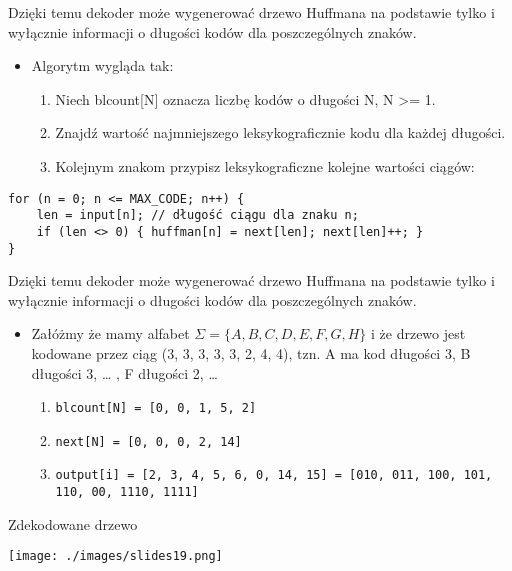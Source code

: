 \documentclass[presentation]{beamer}
\begin{document}
\begin{frame}[fragile,label={sec:orgca05249}]{Dzięki temu dekoder może wygenerować drzewo Huffmana na podstawie tylko i wyłącznie informacji o długości kodów dla poszczególnych znaków.}
 \begin{itemize}
\item Algorytm wygląda tak:
\begin{enumerate}
\item Niech blcount[N] oznacza liczbę kodów o długości N, N >= 1.
\item Znajdź wartość najmniejszego leksykograficznie kodu dla każdej długości.
\item Kolejnym znakom przypisz leksykograficzne kolejne wartości ciągów:
\end{enumerate}
\end{itemize}
\begin{verbatim}
for (n = 0; n <= MAX_CODE; n++) {
    len = input[n]; // długość ciągu dla znaku n;
    if (len <> 0) { huffman[n] = next[len]; next[len]++; }
}
\end{verbatim}
\end{frame}

\begin{frame}[label={sec:orgbed7e80}]{Dzięki temu dekoder może wygenerować drzewo Huffmana na podstawie tylko i wyłącznie informacji o długości kodów dla poszczególnych znaków.}
\begin{itemize}
\item Załóżmy że mamy alfabet \(\Sigma = \{A, B, C, D, E, F, G, H\}\) i
że drzewo jest kodowane przez ciąg (3, 3, 3, 3, 3, 2, 4, 4),
tzn. A ma kod długości 3, B długości 3, \ldots{} , F długości 2, \ldots{}
\begin{enumerate}
\item \texttt{blcount[N] = [0, 0, 1, 5, 2]}
\item \texttt{next[N] = [0, 0, 0, 2, 14]}
\item \texttt{output[i] = [2, 3, 4, 5, 6, 0, 14, 15] = [010, 011, 100, 101, 110, 00, 1110, 1111]}
\end{enumerate}
\end{itemize}
\end{frame}

\begin{frame}[label={sec:org5e2d01b}]{Zdekodowane drzewo}
\begin{center}
\texttt{[image: ./images/slides19.png]}
\end{center}
\end{frame}
\end{document}
